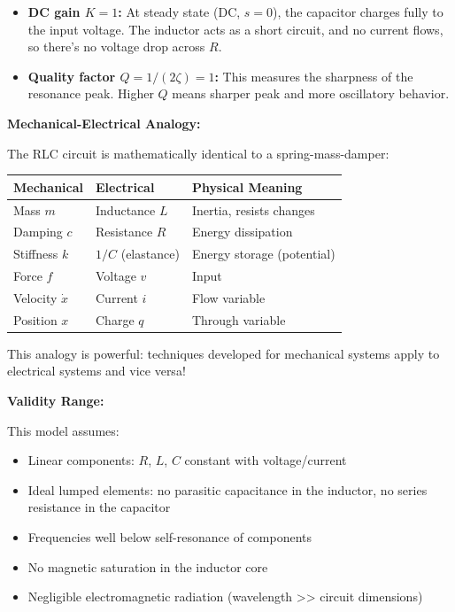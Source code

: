 \begin{example}
\begin{itemize}
    \item \textbf{DC gain $K = 1$:} At steady state (DC, $s=0$), the capacitor charges fully to the input voltage. The inductor acts as a short circuit, and no current flows, so there's no voltage drop across $R$.

    \item \textbf{Quality factor $Q = 1/(2\zeta) = 1$:} This measures the sharpness of the resonance peak. Higher $Q$ means sharper peak and more oscillatory behavior.
\end{itemize}

\textbf{Mechanical-Electrical Analogy:}

The RLC circuit is mathematically identical to a spring-mass-damper:

\begin{center}
\begin{tabular}{lll}
\toprule
\textbf{Mechanical} & \textbf{Electrical} & \textbf{Physical Meaning} \\
\midrule
Mass $m$ & Inductance $L$ & Inertia, resists changes \\
Damping $c$ & Resistance $R$ & Energy dissipation \\
Stiffness $k$ & $1/C$ (elastance) & Energy storage (potential) \\
Force $f$ & Voltage $v$ & Input \\
Velocity $\dot{x}$ & Current $i$ & Flow variable \\
Position $x$ & Charge $q$ & Through variable \\
\bottomrule
\end{tabular}
\end{center}

This analogy is powerful: techniques developed for mechanical systems apply to electrical systems and vice versa!

\textbf{Validity Range:}

This model assumes:
\begin{itemize}
    \item Linear components: $R$, $L$, $C$ constant with voltage/current
    \item Ideal lumped elements: no parasitic capacitance in the inductor, no series resistance in the capacitor
    \item Frequencies well below self-resonance of components
    \item No magnetic saturation in the inductor core
    \item Negligible electromagnetic radiation (wavelength >> circuit dimensions)
\end{itemize}


\end{example}
